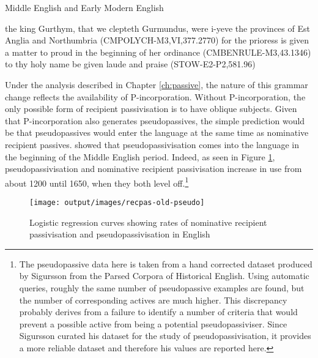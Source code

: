 	\begin{exe}
		\ex Middle English \citep{Kroch.2000} and Early Modern English \citep{Kroch.2004}
		\begin{xlist}
			\ex\label{ex:obliq-rec-eng} the king Gurthym, that we clepteth Gurmundus, were i-yeve the provinces of Est Anglia and Northumbria (CMPOLYCH-M3,VI,377.2770)
			\ex\label{ex:nom-rec-eng} for the prioress is given a matter to proud in the beginning of her ordinance (CMBENRULE-M3,43.1346)
			\ex\label{ex:obliq-to-rec-eng} to thy holy name be given laude and praise (STOW-E2-P2,581.96)
		\end{xlist}
	\end{exe}

	Under the analysis described in Chapter \ref{ch:passive}, the nature of this grammar change reflects the availability of P-incorporation. Without P-incorporation, the only possible form of recipient passivisation is to have oblique subjects. Given that P-incorporation also generates pseudopassives, the simple prediction would be that pseudopassives would enter the language at the same time as nominative recipient passives. \cite{Sigursson.2014} showed that pseudopassivisation comes into the language in the beginning of the Middle English period. Indeed, as seen in Figure \ref{fig:recpas-pseudo}, pseudopassivisation and nominative recipient passivisation increase in use from about 1200 until 1650, when they both level off.\footnote{The pseudopassive data here is taken from a hand corrected dataset produced by Sigursson from the Parsed Corpora of Historical English. Using automatic queries, roughly the same number of pseudopassive examples are found, but the number of corresponding actives are much higher. This discrepancy probably derives from a failure to identify a number of criteria that would prevent a possible active from being a potential pseudopassiviser. Since Sigursson curated his dataset for the study of pseudopassivisation, it provides a more reliable dataset and therefore his values are reported here.}

	\begin{figure}[ht!]
		\texttt{[image: output/images/recpas-old-pseudo]}
		\caption{Logistic regression curves showing rates of nominative recipient passivisation and pseudopassivisation in English}
		\label{fig:recpas-pseudo}
	\end{figure}

